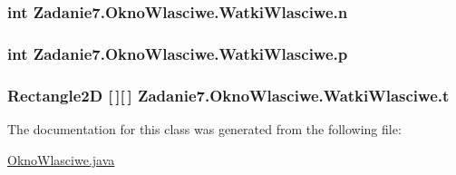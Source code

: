 \subsubsection[{\texorpdfstring{n}{n}}]{\setlength{\rightskip}{0pt plus 5cm}int Zadanie7.\+Okno\+Wlasciwe.\+Watki\+Wlasciwe.\+n\hspace{0.3cm}{\ttfamily [package]}}\hypertarget{class_zadanie7_1_1_okno_wlasciwe_1_1_watki_wlasciwe_a1e976e2b4da195c9013b64ed548cd0ca}{}\label{class_zadanie7_1_1_okno_wlasciwe_1_1_watki_wlasciwe_a1e976e2b4da195c9013b64ed548cd0ca}
\subsubsection[{\texorpdfstring{p}{p}}]{\setlength{\rightskip}{0pt plus 5cm}int Zadanie7.\+Okno\+Wlasciwe.\+Watki\+Wlasciwe.\+p\hspace{0.3cm}{\ttfamily [package]}}\hypertarget{class_zadanie7_1_1_okno_wlasciwe_1_1_watki_wlasciwe_a22e8786a26cf4b1898ae0d69f4bd01b9}{}\label{class_zadanie7_1_1_okno_wlasciwe_1_1_watki_wlasciwe_a22e8786a26cf4b1898ae0d69f4bd01b9}
\subsubsection[{\texorpdfstring{t}{t}}]{\setlength{\rightskip}{0pt plus 5cm}Rectangle2D \mbox{[}$\,$\mbox{]}\mbox{[}$\,$\mbox{]} Zadanie7.\+Okno\+Wlasciwe.\+Watki\+Wlasciwe.\+t\hspace{0.3cm}{\ttfamily [private]}}\hypertarget{class_zadanie7_1_1_okno_wlasciwe_1_1_watki_wlasciwe_ac3435b7920d2703e6dac78ec74ac36d6}{}\label{class_zadanie7_1_1_okno_wlasciwe_1_1_watki_wlasciwe_ac3435b7920d2703e6dac78ec74ac36d6}


The documentation for this class was generated from the following file\+:\begin{DoxyCompactItemize}
\item 
\hyperlink{_okno_wlasciwe_8java}{Okno\+Wlasciwe.\+java}\end{DoxyCompactItemize}
